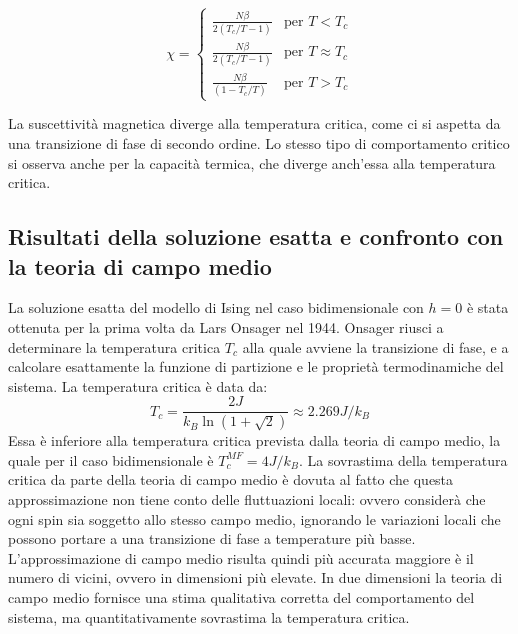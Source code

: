 \begin{equation}
    \chi = \begin{cases}
    \frac{N \beta}{2 (T_c / T - 1)} & \text{per } T < T_c \\
    \frac{N \beta}{2 (T_c / T - 1)} & \text{per } T \approx T_c \\
    \frac{N \beta}{(1 - T_c / T)} & \text{per } T > T_c 
    \end{cases}
\end{equation}

La suscettività magnetica diverge alla temperatura critica, come ci si aspetta da una transizione di fase di secondo ordine.
Lo stesso tipo di comportamento critico si osserva anche per la capacità termica, che diverge anch'essa alla temperatura critica.

\subsection{Risultati della soluzione esatta e confronto con la teoria di campo medio} 
La soluzione esatta del modello di Ising nel caso bidimensionale con $h=0$ è stata ottenuta per la prima volta da Lars Onsager nel 1944.
Onsager riusci a determinare la temperatura critica $T_c$ alla quale avviene la transizione di fase, e a calcolare esattamente la funzione di partizione e le proprietà termodinamiche del sistema.
La temperatura critica è data da:
\begin{equation}
    T_c = \frac{2J}{k_B \ln(1 + \sqrt{2})} \approx 2.269 J/k_B
\end{equation}
Essa è inferiore alla temperatura critica prevista dalla teoria di campo medio, la quale per il caso bidimensionale è $T_c^{MF}= 4J/k_B$. 
La sovrastima della temperatura critica da parte della teoria di campo medio è dovuta al fatto che questa approssimazione non tiene conto delle fluttuazioni locali: 
ovvero considerà che ogni spin sia soggetto allo stesso campo medio, ignorando le variazioni locali che possono portare a una transizione di fase a temperature più basse.
L'approssimazione di campo medio risulta quindi più accurata maggiore è il numero di vicini, ovvero in dimensioni più elevate.
In due dimensioni la teoria di campo medio fornisce una stima qualitativa corretta del comportamento del sistema, ma quantitativamente sovrastima la temperatura critica.
